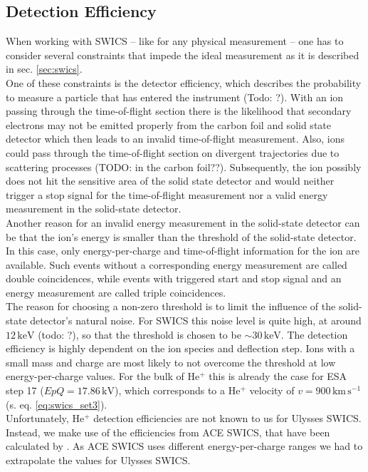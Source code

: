 \subsection{Detection Efficiency}
\label{subsec:det_eff}
When working with SWICS -- like for any physical measurement -- one has to consider several constraints that impede the ideal measurement as it is described in sec. \ref{sec:swics}. \\
One of these constraints is the detector efficiency, which describes the probability to measure a particle that has entered the instrument (Todo: ?). 
With an ion passing through the time-of-flight section there is the likelihood that secondary electrons may not be emitted properly from the carbon foil and solid state detector which then leads to an invalid time-of-flight measurement. Also, ions could pass through the time-of-flight section on divergent trajectories due to scattering processes (TODO: in the carbon foil??). Subsequently, the ion possibly does not hit the sensitive area of the solid state detector and would neither trigger a stop signal for the time-of-flight measurement nor a valid energy measurement in the solid-state detector.\\
Another reason for an invalid energy measurement in the solid-state detector can be that the ion's energy is smaller than the threshold of the solid-state detector. In this case, only energy-per-charge and time-of-flight information for the ion are available. Such events without a corresponding energy measurement are called double coincidences, while events with triggered start and stop signal and an energy measurement are called triple coincidences.\\
The reason for choosing a non-zero threshold is to limit the influence of the solid-state detector's natural noise. For SWICS this noise level is quite high, at around $12\,\mathrm{keV}$ \citep{gloeckler_1992} (todo: ?), so that the threshold is chosen to be $\sim 30 \, \mathrm{keV}$. 
The detection efficiency is highly dependent on the ion species and deflection step.
Ions with a small mass and charge are most likely to not overcome the threshold at low energy-per-charge values. For the bulk of $\mathrm{He^{+}}$ this is already the case for ESA step 17 ($EpQ = 17.86\,\mathrm{kV}$), which corresponds to a $\mathrm{He^{+}}$ velocity of $v = 900\,\mathrm{km\,s^{-1}}$ (s. eq. \ref{eq:swics_set3}).\\
Unfortunately, $\mathrm{He^{+}}$ detection efficiencies are not known to us for Ulysses SWICS. Instead, we make use of the efficiencies from ACE SWICS, that have been calculated by \citet{koeten}. As ACE SWICS uses different energy-per-charge ranges we had to extrapolate the values for Ulysses SWICS.
